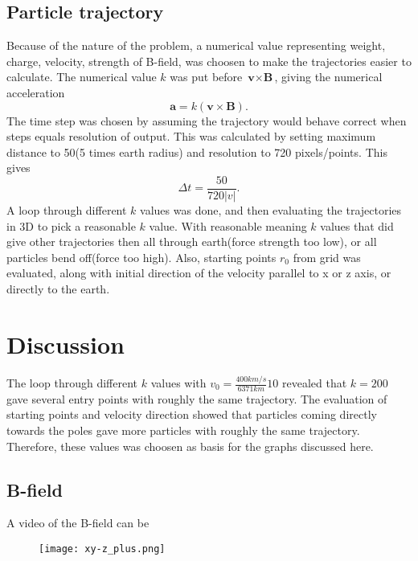 \documentclass[11pt,a4paper]{article}
\begin{document}
\subsection{Particle trajectory}
Because of the nature of the problem, a numerical value representing weight, charge, velocity, strength of B-field, was choosen to make the trajectories easier to calculate.  The numerical value $k$ was put before $\textbf{v}\times\textbf{B}$, giving the numerical acceleration
\begin{equation}
\label{equation.numericalAcceleration}
\textbf{a} = k(\textbf{v}\times\textbf{B}).
\end{equation}
The time step was chosen by assuming the trajectory would behave correct when steps equals resolution of output. This was calculated by setting maximum distance to 50(5 times earth radius) and resolution to 720 pixels/points. This gives
\begin{equation}
\label{equation.dt}
\Delta t = \frac{50}{720|v|}.
\end{equation}
A loop through different $k$ values was done, and then evaluating the trajectories in 3D to pick a reasonable $k$ value. With reasonable meaning $k$ values that did give other trajectories then all through earth(force strength too low), or all particles bend off(force too high). Also, starting points $r_0$ from grid was evaluated, along with initial direction of the velocity parallel to x or z axis, or directly to the earth.
\section{Discussion}
The loop through different $k$ values with $v_0=\frac{400km/s}{6371km}10$ revealed that $k=200$ gave several entry points with roughly the same trajectory. The evaluation of starting points and velocity direction showed that particles coming directly towards the poles gave more particles with roughly the same trajectory. Therefore, these values was choosen as basis for the graphs discussed here.
\subsection{B-field}
A video of the B-field can be 
\begin{center}
\begin{figure}[htbp] %
\label{figure.B-field}
\texttt{[image: xy-z\_plus.png]}
\caption{}
\end{figure}
\end{center}
\end{document}
